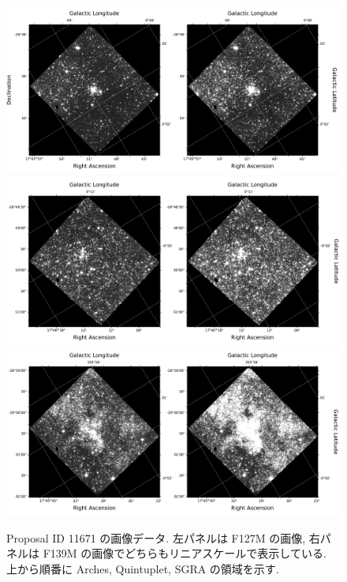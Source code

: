 \documentclass[10pt,a4paper,dvipdfmx,uplatex]{jsarticle}
\begin{document}
\begin{figure}
  \centering
  \includegraphics[width=\linewidth]{img/hst_11671_04_wfc3_ir_f127m_drz.pdf}
  \includegraphics[width=\linewidth]{img/hst_11671_05_wfc3_ir_f127m_drz.pdf}
  \includegraphics[width=\linewidth]{img/hst_11671_06_wfc3_ir_f127m_drz.pdf}
  \caption{Proposal ID 11671 の画像データ. 左パネルは F127M の画像, 右パネルは F139M の画像でどちらもリニアスケールで表示している. 上から順番に Arches, Quintuplet, SGRA の領域を示す.}
  \label{fig:11671}
\end{figure}
\end{document}
